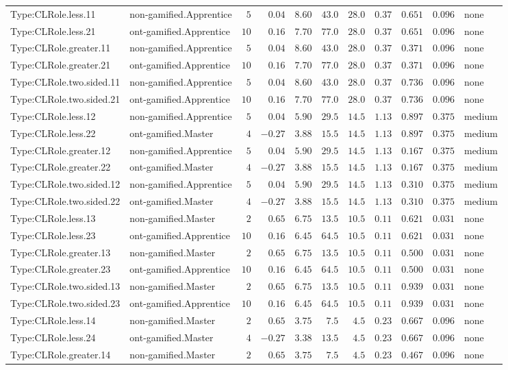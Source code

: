 \documentclass[6pt,a4paper]{article}
\begin{document}
{\begin{longtable}{llrrrrrrrrl}
Type:CLRole.less.11&non-gamified.Apprentice&$ 5$&$ 0.04$&$ 8.60$&$ 43.0$&$28.0$&$0.37$&$0.651$&$0.096$&none\tabularnewline
Type:CLRole.less.21&ont-gamified.Apprentice&$10$&$ 0.16$&$ 7.70$&$ 77.0$&$28.0$&$0.37$&$0.651$&$0.096$&none\tabularnewline
Type:CLRole.greater.11&non-gamified.Apprentice&$ 5$&$ 0.04$&$ 8.60$&$ 43.0$&$28.0$&$0.37$&$0.371$&$0.096$&none\tabularnewline
Type:CLRole.greater.21&ont-gamified.Apprentice&$10$&$ 0.16$&$ 7.70$&$ 77.0$&$28.0$&$0.37$&$0.371$&$0.096$&none\tabularnewline
Type:CLRole.two.sided.11&non-gamified.Apprentice&$ 5$&$ 0.04$&$ 8.60$&$ 43.0$&$28.0$&$0.37$&$0.736$&$0.096$&none\tabularnewline
Type:CLRole.two.sided.21&ont-gamified.Apprentice&$10$&$ 0.16$&$ 7.70$&$ 77.0$&$28.0$&$0.37$&$0.736$&$0.096$&none\tabularnewline
Type:CLRole.less.12&non-gamified.Apprentice&$ 5$&$ 0.04$&$ 5.90$&$ 29.5$&$14.5$&$1.13$&$0.897$&$0.375$&medium\tabularnewline
Type:CLRole.less.22&ont-gamified.Master&$ 4$&$-0.27$&$ 3.88$&$ 15.5$&$14.5$&$1.13$&$0.897$&$0.375$&medium\tabularnewline
Type:CLRole.greater.12&non-gamified.Apprentice&$ 5$&$ 0.04$&$ 5.90$&$ 29.5$&$14.5$&$1.13$&$0.167$&$0.375$&medium\tabularnewline
Type:CLRole.greater.22&ont-gamified.Master&$ 4$&$-0.27$&$ 3.88$&$ 15.5$&$14.5$&$1.13$&$0.167$&$0.375$&medium\tabularnewline
Type:CLRole.two.sided.12&non-gamified.Apprentice&$ 5$&$ 0.04$&$ 5.90$&$ 29.5$&$14.5$&$1.13$&$0.310$&$0.375$&medium\tabularnewline
Type:CLRole.two.sided.22&ont-gamified.Master&$ 4$&$-0.27$&$ 3.88$&$ 15.5$&$14.5$&$1.13$&$0.310$&$0.375$&medium\tabularnewline
Type:CLRole.less.13&non-gamified.Master&$ 2$&$ 0.65$&$ 6.75$&$ 13.5$&$10.5$&$0.11$&$0.621$&$0.031$&none\tabularnewline
Type:CLRole.less.23&ont-gamified.Apprentice&$10$&$ 0.16$&$ 6.45$&$ 64.5$&$10.5$&$0.11$&$0.621$&$0.031$&none\tabularnewline
Type:CLRole.greater.13&non-gamified.Master&$ 2$&$ 0.65$&$ 6.75$&$ 13.5$&$10.5$&$0.11$&$0.500$&$0.031$&none\tabularnewline
Type:CLRole.greater.23&ont-gamified.Apprentice&$10$&$ 0.16$&$ 6.45$&$ 64.5$&$10.5$&$0.11$&$0.500$&$0.031$&none\tabularnewline
Type:CLRole.two.sided.13&non-gamified.Master&$ 2$&$ 0.65$&$ 6.75$&$ 13.5$&$10.5$&$0.11$&$0.939$&$0.031$&none\tabularnewline
Type:CLRole.two.sided.23&ont-gamified.Apprentice&$10$&$ 0.16$&$ 6.45$&$ 64.5$&$10.5$&$0.11$&$0.939$&$0.031$&none\tabularnewline
Type:CLRole.less.14&non-gamified.Master&$ 2$&$ 0.65$&$ 3.75$&$  7.5$&$ 4.5$&$0.23$&$0.667$&$0.096$&none\tabularnewline
Type:CLRole.less.24&ont-gamified.Master&$ 4$&$-0.27$&$ 3.38$&$ 13.5$&$ 4.5$&$0.23$&$0.667$&$0.096$&none\tabularnewline
Type:CLRole.greater.14&non-gamified.Master&$ 2$&$ 0.65$&$ 3.75$&$  7.5$&$ 4.5$&$0.23$&$0.467$&$0.096$&none\tabularnewline

\end{longtable}}
\end{document}
